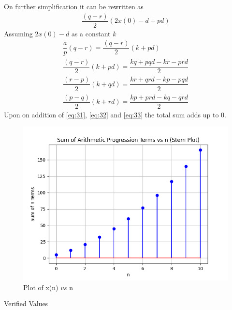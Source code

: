 \documentclass[journal,12pt,twocolumn]{IEEEtran}
\theoremstyle{remark}
\begin{document}
On further simplification it can be rewritten as 
\begin{align}
    \dfrac{(q-r)}{2}(2x(0)-d+pd)
\end{align}
Assuming $2x(0)-d$ as a constant $k$
\begin{align}
    \dfrac{a}{p}(q-r) = \dfrac{(q-r)}{2}(k+pd)\\
    \dfrac{(q-r)}{2}(k+pd) = \dfrac{kq+pqd-kr-prd}{2}\label{eq:31}\\
    \dfrac{(r-p)}{2}(k+qd) = \dfrac{kr+qrd-kp-pqd}{2}\label{eq:32}\\
    \dfrac{(p-q)}{2}(k+rd) = \dfrac{kp+prd-kq-qrd}{2}\label{eq:33}
\end{align}
Upon on addition of \eqref{eq:31}, \eqref{eq:32} and \eqref{eq:33} the total sum adds up to 0.
\begin{figure}[ht]
    \centering
    \includegraphics[width=\columnwidth]{figs/figure_1.png}
    \caption{Plot of x(n) $vs$ n}
    \label{fig:11.9.2.11.2}
\end{figure}
\begin{table}[ht]
    \centering
    \def\arraystretch{1.5}
    
    \caption{Verified Values}
    \label{tab:11.9.2.11.3}
\end{table}
\end{document}
